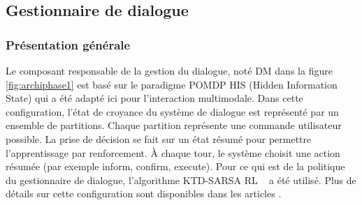 \documentclass[a4paper,11pt,twoside]{StyleThese}
\begin{document}


\subsection{Gestionnaire de dialogue}
\subsubsection{Présentation générale}
Le composant responsable de la gestion du dialogue, noté DM dans la figure \ref{fig:archiphase1} est basé sur le paradigme POMDP HIS (Hidden Information State) \cite{Young10} qui a été adapté ici pour l'interaction multimodale. Dans cette configuration, l'état de croyance du système de dialogue est représenté par un ensemble de partitions. Chaque partition représente une commande utilisateur possible. La prise de décision se fait sur un état résumé pour permettre l'apprentissage par renforcement. À chaque tour, le système choisit une action résumée (par exemple inform, confirm, execute).
Pour ce qui est de la politique du gestionnaire de dialogue, l'algorithme KTD-SARSA RL ~\cite{Daubigney12} a été utilisé. Plus de détails sur cette configuration sont disponibles dans les articles \cite{Ferreira13a,Ferreira13b}.
\end{document}
